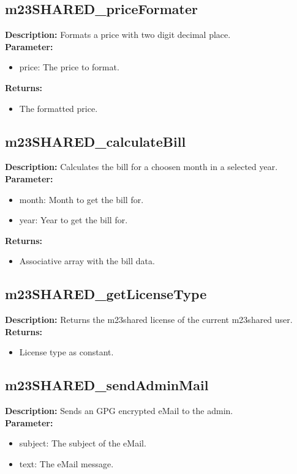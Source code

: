 \subsection{m23SHARED\_priceFormater}
\textbf{Description:} Formats a price with two digit decimal place.\\
\textbf{Parameter:}
\begin{itemize}
\item price: The price to format.
\end{itemize}
\textbf{Returns:}
\begin{itemize}
\item The formatted price.
\end{itemize}

\subsection{m23SHARED\_calculateBill}
\textbf{Description:} Calculates the bill for a choosen month in a selected year.\\
\textbf{Parameter:}
\begin{itemize}
\item month: Month to get the bill for.
\item year: Year to get the bill for.
\end{itemize}
\textbf{Returns:}
\begin{itemize}
\item Associative array with the bill data.
\end{itemize}

\subsection{m23SHARED\_getLicenseType}
\textbf{Description:} Returns the m23shared license of the current m23shared user.\\
\textbf{Returns:}
\begin{itemize}
\item License type as constant.
\end{itemize}

\subsection{m23SHARED\_sendAdminMail}
\textbf{Description:} Sends an GPG encrypted eMail to the admin.\\
\textbf{Parameter:}
\begin{itemize}
\item subject: The subject of the eMail.
\item text: The eMail message.
\end{itemize}

